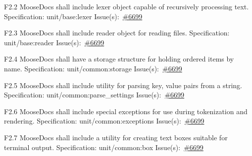 \begin{Requirement}{F2.2}
MooseDocs shall include lexer object capable of recursively processing text.
\newline
Specification: unit/base:lexer
\newline
Issue(s):~\href{https://github.com/idaholab/moose/issues/6699}{\#6699}
\end{Requirement}

\begin{Requirement}{F2.3}
MooseDocs shall include reader object for reading files.
\newline
Specification: unit/base:reader
\newline
Issue(s):~\href{https://github.com/idaholab/moose/issues/6699}{\#6699}
\end{Requirement}

\begin{Requirement}{F2.4}
MooseDocs shall have a storage structure for holding ordered items by name.
\newline
Specification: unit/common:storage
\newline
Issue(s):~\href{https://github.com/idaholab/moose/issues/6699}{\#6699}
\end{Requirement}

\begin{Requirement}{F2.5}
MooseDocs shall include utility for parsing key, value pairs from a string.
\newline
Specification: unit/common:parse\_settings
\newline
Issue(s):~\href{https://github.com/idaholab/moose/issues/6699}{\#6699}
\end{Requirement}

\begin{Requirement}{F2.6}
MooseDocs shall include special exceptions for use during tokenization and rendering.
\newline
Specification: unit/common:exceptions
\newline
Issue(s):~\href{https://github.com/idaholab/moose/issues/6699}{\#6699}
\end{Requirement}

\begin{Requirement}{F2.7}
MooseDocs shall include a utility for creating text boxes suitable for terminal output.
\newline
Specification: unit/common:box
\newline
Issue(s):~\href{https://github.com/idaholab/moose/issues/6699}{\#6699}
\end{Requirement}

